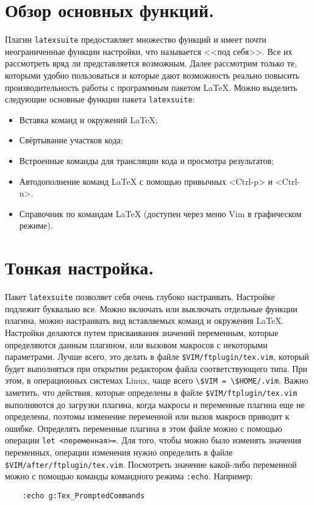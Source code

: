 \documentclass[a4paper]{article}
\begin{document}
\part{Обзор основных функций.}\label{part:main-functions}
Плагин \texttt{latexsuite} предоставляет множество функций и имеет почти
неограниченные функции настройки, что называется <<под себя>>. Все их
рассмотреть вряд ли представляется возможным. Далее рассмотрим только те,
которыми удобно пользоваться и которые дают возможность реально 
повысить производительность работы с программным пакетом \LaTeX.
Можно выделить следующие основные функции пакета \texttt{latexsuite}:
\begin{itemize}
	\item Вставка команд и окружений \LaTeX;
	\item Свёртывание участков кода;
	\item Встроенные команды для трансляции кода и просмотра результатов;
	\item Автодополнение команд \LaTeX{} с помощью привычных <Ctrl-p> и <Ctrl-n>.
	\item Справочник по командам \LaTeX{} (доступен через меню Vim в графическом режиме).
\end{itemize}
\part{Тонкая настройка.}\label{part:settings}
Пакет \texttt{latexsuite} позволяет себя очень глубоко настраивать.
Настройке подлежит буквально все. Можно включать или выключать отдельные функции плагина,
можно настраивать вид вставляемых команд и окружения \LaTeX. Настройки делаются путем
присваивания значений переменным, которые определяются данным плагином, или вызовом 
макросов с некоторыми параметрами. Лучше всего, это делать в файле \verb|$VIM/ftplugin/tex.vim|,
который будет выполняться при открытии редактором файла соответствующего типа. 
При этом, в операционных системах Linux, 
чаще всего \verb|\$VIM = \$HOME/.vim|. Важно заметить, что действия, которые определены в
файле \verb|$VIM/ftplugin/tex.vim| выполняются до загрузки плагина, когда макросы и переменные
плагина еще не определены, поэтомы изменение переменной или вызов макросв приводит к ошибке. 
Определять переменные плагина в этом файле можно с помощью операции \verb|let <переменная>=|. 
Для того, чтобы можно было изменять значения переменных, операции изменения нужно определить в файле
\verb|$VIM/after/ftplugin/tex.vim|.\sloppy
Посмотреть значение какой-либо переменной можно с помощью команды командного режима \verb|:echo|. 
Например:
\begin{verbatim}
	:echo g:Tex_PromptedCommands
\end{verbatim}
\end{document}
